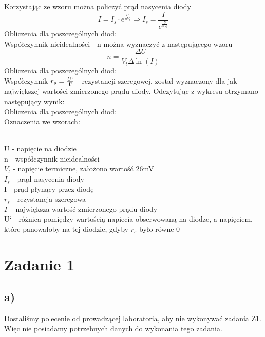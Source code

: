 \documentclass{article}
\begin{document}
Korzystając ze wzoru można policzyć prąd nasycenia diody\[
  I = I_s \cdot e^{\frac{U}{nV_t}} \Rightarrow
  I_s = \frac{I}{e^{\frac{U}{nV_t}}} 
\]
Obliczenia dla poszczególnych diod: \\
Współczynnik nieidealności - n można wyznaczyć z następującego wzoru \[
  n = \frac{\Delta{U}}{V_t \Delta{\ln(I)}}
\]
Obliczenia dla poszczególnych diod: \\
Współczynnik $r_s=\frac{U`}{\Gamma}$ - rezystancji szeregowej, został wyznaczony dla jak największej wartości zmierzonego prądu diody. Odczytując z wykresu otrzymano następujący wynik:\\
Obliczenia dla poszczególnych diod: \\
Oznaczenia we wzorach:
\raggedright
\\ U - napięcie na diodzie\\ n - współczynnik nieidealności\\ $V_t$ - napięcie termiczne, założono wartość 26mV\\ 
$I_s$ - prąd nasycenia diody\\ I - prąd płynący przez diodę\\ $r_s$ - rezystancja szeregowa\\ $\Gamma$ - największa wartość zmierzonego prądu diody \\
U` - różnica pomiędzy wartością napiecia obserwowaną na diodze, a napięciem, które panowałoby na tej diodzie, gdyby $r_s$ było równe 0\\
\clearpage
\raggedright
\section{Zadanie 1}
\subsection{a)}
\centering
Dostaliśmy polecenie od prowadzącej laboratoria, aby nie wykonywać zadania Z1. Więc nie posiadamy potrzebnych danych do wykonania tego zadania.
\raggedright
\end{document}
